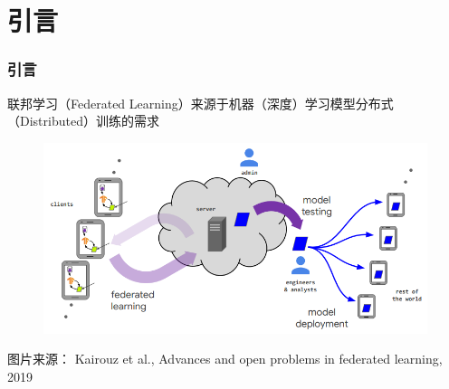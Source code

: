 





\section{引言}


\begin{frame}
\frametitle{引言}

联邦学习（Federated Learning）来源于机器（深度）学习模型分布式（Distributed）训练的需求

\begin{figure}
    \centering
    \includegraphics[width=\textwidth,keepaspectratio]{images/fl_overview.png}
\end{figure}

{\scriptsize
图片来源：\cite{kairouz2019advances_fl} Kairouz et al., Advances and open problems in federated learning, 2019
}

\end{frame}


